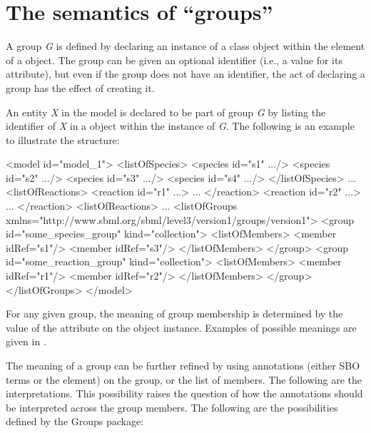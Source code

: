 \section{The semantics of ``groups''}
\label{semantics}

A group \emph{G} is defined by declaring an instance of a \Group class object within the \ListOfGroups element of a \Model object. The group can be given an optional identifier (i.e., a value for its  attribute), but even if the group does not have an identifier, the act of declaring a group has the effect of creating it.

An entity \emph{X} in the model is declared to be part of group \emph{G} by listing the identifier of \emph{X} in a \Member object within the \ListOfGroups instance of \emph{G}. The following is an example to illustrate the structure:

\begin{example}
<model id="model_1"> 
  <listOfSpecies> 
    <species id="s1" .../> 
    <species id="s2" .../> 
    <species id="s3" .../> 
    <species id="s4" .../> 
  </listOfSpecies> 
  ... 
  <listOfReactions> 
    <reaction id="r1" ...> ... </reaction> 
    <reaction id="r2" ...> ... </reaction> 
  <listOfReactions> 
  ... 
  <listOfGroups xmlns="http://www.sbml.org/sbml/level3/version1/groups/version1"> 
    <group id="some_species_group" kind="collection"> 
      <listOfMembers> 
        <member idRef="s1"/> 
        <member idRef="s3"/> 
      </listOfMembers> 
    </group> 
    <group id="some_reaction_group" kind="collection"> 
      <listOfMembers> 
        <member idRef="r1"/> 
        <member idRef="r2"/> 
      </listOfMembers> 
    </group> 
  </listOfGroups> 
</model>
\end{example}

For any given group, the meaning of group membership is determined by the value of the attribute  on the \Group object instance.  Examples of possible meanings are given in .

The meaning of a group can be further refined by using annotations (either SBO terms or the \Annotation element) on the group, or the list of members. The following are the interpretations.  This possibility raises the question of how the annotations should be interpreted across the group members.  The following are the possibilities defined by the Groups package:

